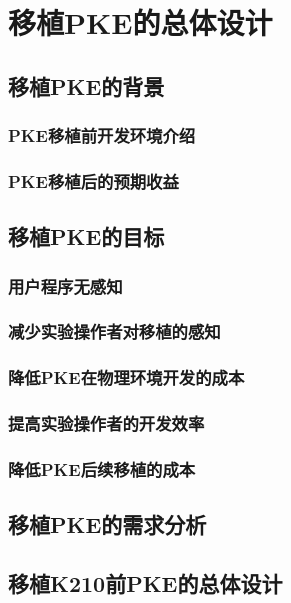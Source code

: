 \chapter{移植PKE的总体设计}

\section{移植PKE的背景}

\subsection{PKE移植前开发环境介绍}

\subsection{PKE移植后的预期收益}

\section{移植PKE的目标}

\subsection{用户程序无感知}

\subsection{减少实验操作者对移植的感知}

\subsection{降低PKE在物理环境开发的成本}

\subsection{提高实验操作者的开发效率}

\subsection{降低PKE后续移植的成本}

\section{移植PKE的需求分析}

\section{移植K210前PKE的总体设计}

